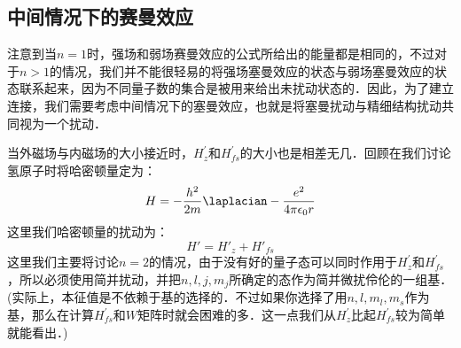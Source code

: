 \subsection{中间情况下的赛曼效应}
注意到当$n=1$时，强场和弱场赛曼效应的公式所给出的能量都是相同的，不过对于$n > 1$的情况，我们并不能很轻易的将强场塞曼效应的状态与弱场塞曼效应的状态联系起来，因为不同量子数的集合是被用来给出未扰动状态的．因此，为了建立连接，我们需要考虑中间情况下的塞曼效应，也就是将塞曼扰动与精细结构扰动共同视为一个扰动．

当外磁场与内磁场的大小接近时，$H_z^{'}$和$H_{fs}^{'}$的大小也是相差无几．回顾在我们讨论氢原子时将哈密顿量定为：\begin{equation}
H=-\frac{h^2}{2m}\laplacian-\frac{e^2}{4\pi\epsilon_0 r}
\end{equation}
这里我们哈密顿量的扰动为：
\begin{equation}
H'=H'_z+H'_{fs}
\end{equation}
这里我们主要将讨论$n=2$的情况，由于没有好的量子态可以同时作用于$H_z^{'}$和$H_{fs}^{'}$，所以必须使用简并扰动，并把$n,l,j,m_j$所确定的态作为简并微扰伶伦的一组基．(实际上，本征值是不依赖于基的选择的．不过如果你选择了用$n,l,m_l,m_s$作为基，那么在计算$H_{fs}^{'}$和$W$矩阵时就会困难的多．这一点我们从$H_z^{'}$比起$H_{fs}^{'}$较为简单就能看出．)

